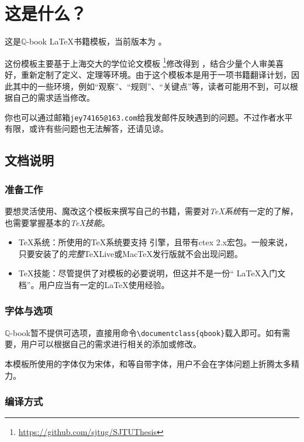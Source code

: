 \chapter{这是什么？}

这是$\mathbb{ Q}$-book \LaTeX 书籍模板，当前版本为 \version 。

这份模板主要基于上海交大的学位论文模板
\footnote{\url{https://github.com/sjtug/SJTUThesis}}修改得到
，结合少量个人审美喜好，重新定制了定义、定理等环境。由于这个模板本是用于一项书籍翻译计划，因此其中的一些环境，例如“观察”、“规则”、“关键点”等，读者可能用不到，可以根据自己的需求适当修改。

你也可以通过邮箱\texttt{jey74165@163.com}给我发邮件反映遇到的问题。不过作者水平有限，或许有些问题也无法解答，还请见谅。

\section{文档说明}

\subsection{准备工作}

要想灵活使用、魔改这个模板来撰写自己的书籍，需要对\emph{TeX系统}有一定的了解，也需要掌握基本的\emph{TeX技能}。

\begin{itemize}[noitemsep,topsep=0pt,parsep=0pt,partopsep=0pt]
	\item {\TeX}系统：所使用的{\TeX}系统要支持 \XeTeX 引擎，且带有ctex 2.x宏包。一般来说，只要安装了的\emph{完整}TeXLive或MacTeX发行版就不会出现问题。
	\item TeX技能：尽管提供了对模板的必要说明，但这并不是一份“ \LaTeX 入门文档”。用户应当有一定的\LaTeX 使用经验。
\end{itemize}

\subsection{字体与选项}

$\mathbb{ Q }$-book暂不提供可选项，直接用命令\verb|\documentclass{qbook}|载入即可。如有需要，用户可以根据自己的需求进行相关的添加或修改。

本模板所使用的字体仅为宋体，{}和{}等自带字体，用户不会在字体问题上折腾太多精力。

\subsection{编译方式}

